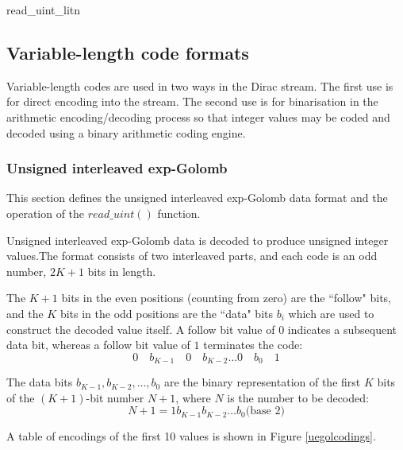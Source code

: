 \begin{pseudo}{read\_uint\_lit}{n}
\bsEND
{}
\end{pseudo}

\subsection{Variable-length code formats}
\label{vlc}
Variable-length codes are used in two ways in the Dirac stream. The first
use is for direct encoding into the stream. The second use is for binarisation
in the arithmetic encoding/decoding process so that integer values may be 
coded and decoded using a binary arithmetic coding engine. 

\subsubsection{Unsigned interleaved exp-Golomb}
This section defines the unsigned interleaved exp-Golomb data format and the operation
of the $read\_uint()$ function. 

Unsigned interleaved exp-Golomb data is decoded to produce unsigned
 integer values.The format consists of two interleaved parts, 
and each code is an odd number, $2K+1$ bits in length.

The $K+1$ bits in the even positions (counting from zero) are the ``follow" bits, and 
the $K$ bits in the odd positions are the ``data" bits $b_i$ which are used to construct
the decoded value itself. A follow bit value of $0$ indicates a subsequent data bit,
whereas a follow bit value of $1$ terminates the code:
\begin{equation*}
0\quad b_{K-1}\quad 0\quad b_{K-2}\hdots 0\quad b_{0}\quad 1
\end{equation*}

The data bits $b_{K-1}, b_{K-2}, \hdots, b_0$ are the binary representation 
 of the first $K$ bits of the $(K+1)$-bit number 
$N+1$, where $N$ is the number to be decoded:
\begin{equation*}
N+1=1 b_{K-1} b_{K-2}\hdots b_0 \text{(base $2$)}
\end{equation*}

A table of encodings of the first 10 values is shown in Figure \ref{uegolcodings}.

